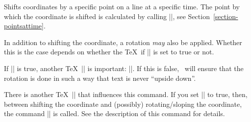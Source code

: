 \begin{command}{\pgftransformlineattime{}}
    Shifts coordinates by a specific point on a line at a specific time. The
    point by which the coordinate is shifted is calculated by calling
    |\pgfpointlineattime|, see Section~\ref{section-pointsattime}.

    In addition to shifting the coordinate, a rotation \emph{may} also be
    applied. Whether this is the case depends on whether the \TeX\ if
    |\ifpgfslopedattime| is set to true or not.
\begin{codeexample}[]
\end{codeexample}
\begin{codeexample}[]
\end{codeexample}
    If |\ifpgfslopedattime| is true, another \TeX\ |\if| is important:
    |\ifpgfallowupsidedownattime|. If this is false, \pgfname\ will ensure that
    the rotation is done in such a way that text is never ``upside down''.

    There is another \TeX\ |\if| that influences this command. If you set
    |\ifpgfresetnontranslationattime| to true, then, between shifting the
    coordinate and (possibly) rotating/sloping the coordinate, the command
    |\pgftransformresetnontranslations| is called. See the description of this
    command for details.
\begin{codeexample}[]
\end{codeexample}
\begin{codeexample}[]
\end{codeexample}
\end{command}

